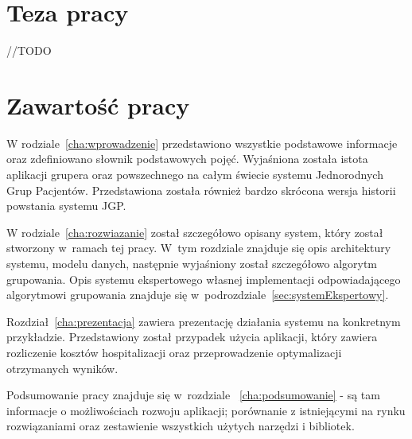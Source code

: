 
\section{Teza pracy}
\label{sec:tezaPracy}
//TODO


\section{Zawartość pracy}
\label{sec:zawartoscPracy}

W rodziale~\ref{cha:wprowadzenie} przedstawiono wszystkie podstawowe informacje oraz zdefiniowano słownik podstawowych pojęć. Wyjaśniona została istota aplikacji grupera oraz powszechnego na całym świecie systemu Jednorodnych Grup Pacjentów. Przedstawiona została również bardzo skrócona wersja historii powstania systemu JGP.

W rodziale~\ref{cha:rozwiazanie} został szczegółowo opisany system, który został stworzony w~ramach tej pracy. W~tym rozdziale znajduje się opis architektury systemu, modelu danych, następnie wyjaśniony został szczegółowo algorytm grupowania. Opis systemu ekspertowego własnej implementacji odpowiadającego algorytmowi grupowania znajduje się w~podrozdziale~\ref{sec:systemEkspertowy}.

Rozdział~\ref{cha:prezentacja} zawiera prezentację działania systemu na konkretnym przykładzie. Przedstawiony został przypadek użycia aplikacji, który zawiera rozliczenie kosztów hospitalizacji oraz przeprowadzenie optymalizacji otrzymanych wyników.

Podsumowanie pracy znajduje się w~rozdziale ~\ref{cha:podsumowanie} - są tam informacje o możliwościach rozwoju aplikacji; porównanie z istniejącymi na rynku rozwiązaniami oraz zestawienie wszystkich użytych narzędzi i bibliotek.

